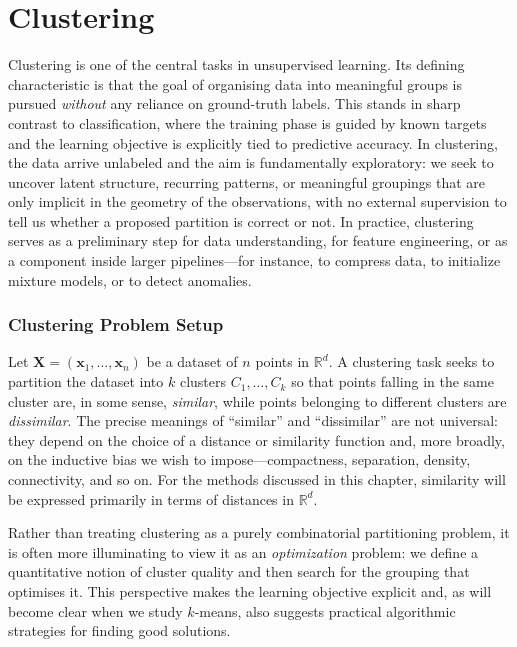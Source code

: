 
\chapter{Clustering}

Clustering is one of the central tasks in unsupervised learning. Its defining characteristic is
that the goal of organising data into meaningful groups is pursued \emph{without} any
reliance on ground-truth labels. This stands in sharp contrast to classification, where the
training phase is guided by known targets and the learning objective is explicitly tied to
predictive accuracy. In clustering, the data arrive unlabeled and the aim is fundamentally
exploratory: we seek to uncover latent structure, recurring patterns, or meaningful groupings
that are only implicit in the geometry of the observations, with no external supervision to tell
us whether a proposed partition is correct or not. In practice, clustering serves as a
preliminary step for data understanding, for feature engineering, or as a component inside
larger pipelines---for instance, to compress data, to initialize mixture models, or to detect
anomalies.

\subsection*{Clustering Problem Setup}

Let $\mathbf{X}=(\mathbf{x}_1,\ldots,\mathbf{x}_n)$ be a dataset of $n$ points in
$\mathbb{R}^d$. A clustering task seeks to partition the dataset into $k$ clusters
$C_1,\ldots,C_k$ so that points falling in the same cluster are, in some sense,
\emph{similar}, while points belonging to different clusters are \emph{dissimilar}. The
precise meanings of ``similar'' and ``dissimilar'' are not universal: they depend on the
choice of a distance or similarity function and, more broadly, on the inductive bias we wish
to impose---compactness, separation, density, connectivity, and so on. For the methods
discussed in this chapter, similarity will be expressed primarily in terms of distances in
$\mathbb{R}^d$.

Rather than treating clustering as a purely combinatorial partitioning problem, it is often
more illuminating to view it as an \emph{optimization} problem: we define a quantitative
notion of cluster quality and then search for the grouping that optimises it. This perspective
makes the learning objective explicit and, as will become clear when we study $k$-means,
also suggests practical algorithmic strategies for finding good solutions.


